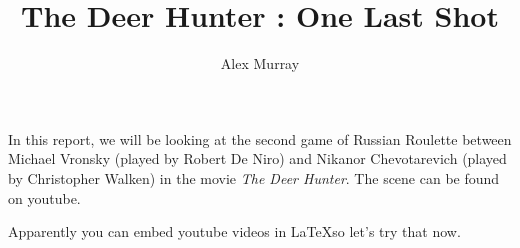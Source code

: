 \documentclass[notitlepage]{fhnwreport}
\title{The Deer Hunter : One Last Shot}
\author{Alex Murray}
\begin{document}
\maketitle

In this report, we will be looking at the second game of Russian Roulette between Michael Vronsky (played by Robert De Niro) and Nikanor Chevotarevich (played by Christopher Walken) in the movie \textit{The Deer Hunter}. The scene can be found on youtube\cite{ref:scene}.

Apparently you can embed youtube videos in \LaTeX so let's try that now.

\end{document}
